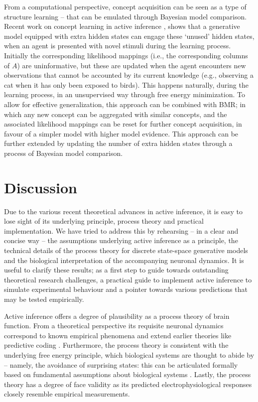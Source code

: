 \documentclass[review,12pt,authoryear]{elsarticle}
\begin{document}
From a computational perspective, concept acquisition can be seen as a type of structure learning \citep{gershmanLearningLatentStructure2010,tervoNeuralImplementationStructure2016} – that can be emulated through Bayesian model comparison. Recent work on concept learning in active inference \citep{smithActiveInferenceModel2019}, shows that a generative model equipped with extra hidden states can engage these ‘unused’ hidden states, when an agent is presented with novel stimuli during the learning process. Initially the corresponding likelihood mappings (i.e., the corresponding columns of $A$) are uninformative, but these are updated when the agent encounters new observations that cannot be accounted by its current knowledge (e.g., observing a cat when it has only been exposed to birds). This happens naturally, during the learning process, in an unsupervised way through free energy minimization. To allow for effective generalization, this approach can be combined with BMR; in which any new concept can be aggregated with similar concepts, and the associated likelihood mappings can be reset for further concept acquisition, in favour of a simpler model with higher model evidence. This approach can be further extended by updating the number of extra hidden states through a process of Bayesian model comparison.

\section{Discussion}
Due to the various recent theoretical advances in active inference, it is easy to lose sight of its underlying principle, process theory and practical implementation. We have tried to address this by rehearsing – in a clear and concise way – the assumptions underlying active inference as a principle, the technical details of the process theory for discrete state-space generative models and the biological interpretation of the accompanying neuronal dynamics. It is useful to clarify these results; as a first step to guide towards outstanding theoretical research challenges, a practical guide to implement active inference to simulate experimental behaviour and a pointer towards various predictions that may be tested empirically.

Active inference offers a degree of plausibility as a process theory of brain function. From a theoretical perspective its requisite neuronal dynamics correspond to known empirical phenomena and extend earlier theories like predictive coding \citep{fristonFreeenergyPrincipleUnified2010,raoPredictiveCodingVisual1999,bastosCanonicalMicrocircuitsPredictive2012}. Furthermore, the process theory is consistent with the underlying free energy principle, which biological systems are thought to abide by – namely, the avoidance of surprising states: this can be articulated formally based on fundamental assumptions about biological systems \citep{parrMarkovBlanketsInformation2020,fristonFreeEnergyPrinciple2019}. Lastly, the process theory has a degree of face validity as its predicted electrophysiological responses closely resemble empirical measurements.
\end{document}
